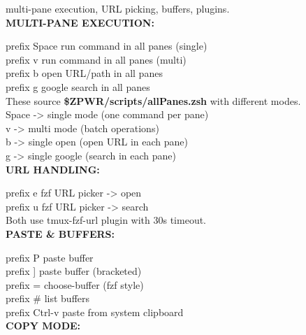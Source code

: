 \documentclass[11pt,a4paper,twoside]{book}
\begin{document}
multi-pane execution, URL picking, buffers, plugins.\\


\vspace{12pt}
{\bfseries\color{neonyellow} MULTI-PANE EXECUTION:}\vspace{4pt}

prefix Space          run command in all panes (single)\\
prefix v              run command in all panes (multi)\\
prefix b              open URL/path in all panes\\
prefix g              google search in all panes\\

These source \textbf{\$ZPWR/scripts/allPanes.zsh} with different modes.\\
Space -> single mode (one command per pane)\\
v     -> multi mode (batch operations)\\
b     -> single open (open URL in each pane)\\
g     -> single google (search in each pane)\\


\vspace{12pt}
{\bfseries\color{neonyellow} URL HANDLING:}\vspace{4pt}

prefix e              fzf URL picker -> open\\
prefix u              fzf URL picker -> search\\

Both use tmux-fzf-url plugin with 30s timeout.\\


\vspace{12pt}
{\bfseries\color{neonyellow} PASTE \& BUFFERS:}\vspace{4pt}

prefix P              paste buffer\\
prefix ]              paste buffer (bracketed)\\
prefix =              choose-buffer (fzf style)\\
prefix \#              list buffers\\
prefix Ctrl-v         paste from system clipboard\\


\vspace{12pt}
{\bfseries\color{neonyellow} COPY MODE:}\vspace{4pt}
\end{document}
